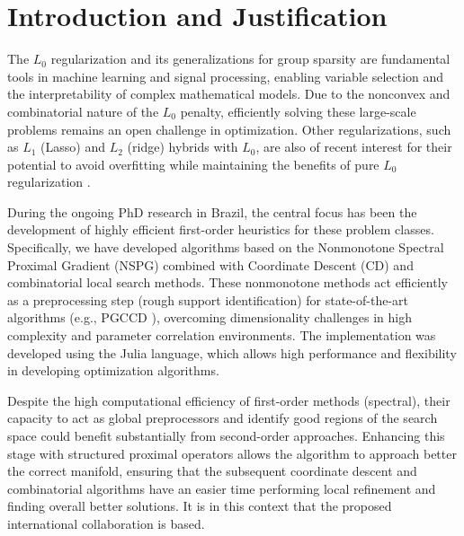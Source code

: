 \section{Introduction and Justification}

The $L_0$ regularization and its generalizations for group sparsity are fundamental tools in machine learning and signal processing, enabling variable selection and the interpretability of complex mathematical models. Due to the nonconvex and combinatorial nature of the $L_0$ penalty, efficiently solving these large-scale problems remains an open challenge in optimization. Other regularizations, such as $L_1$ (Lasso) and $L_2$ (ridge) hybrids with $L_0$, are also of recent interest for their potential to avoid overfitting while maintaining the benefits of pure $L_0$ regularization \cite{fastselect}.

During the ongoing PhD research in Brazil, the central focus has been the development of highly efficient first-order heuristics for these problem classes. Specifically, we have developed algorithms based on the Nonmonotone Spectral Proximal Gradient (NSPG) combined with Coordinate Descent (CD) and combinatorial local search methods. These nonmonotone methods act efficiently as a preprocessing step (rough support identification) for state-of-the-art algorithms (e.g., PGCCD \cite{fastselect}), overcoming dimensionality challenges in high complexity and parameter correlation environments. The implementation was developed using the Julia language, which allows high performance and flexibility in developing optimization algorithms.

Despite the high computational efficiency of first-order methods (spectral), their capacity to act as global preprocessors and identify good regions of the search space could benefit substantially from second-order approaches. Enhancing this stage with structured proximal operators allows the algorithm to approach better the correct manifold, ensuring that the subsequent coordinate descent and combinatorial algorithms have an easier time performing local refinement and finding overall better solutions. It is in this context that the proposed international collaboration is based.

